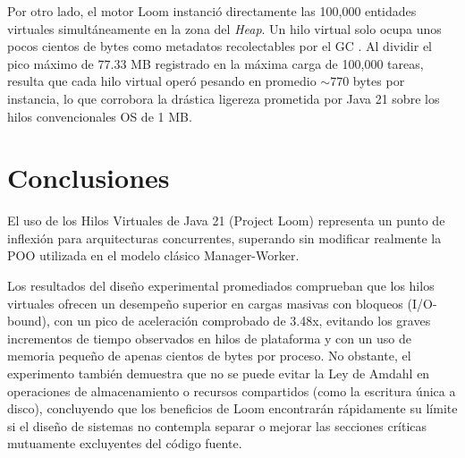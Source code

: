 \documentclass[12pt,a4paper]{article}
\begin{document}
Por otro lado, el motor Loom instanció directamente las 100,000 entidades virtuales simultáneamente en la zona del \textit{Heap}. Un hilo virtual solo ocupa unos pocos cientos de bytes como metadatos recolectables por el GC \cite{jep444}.
Al dividir el pico máximo de $77.33$ MB registrado en la máxima carga de 100,000 tareas, resulta que cada hilo virtual operó pesando en promedio $\sim770$ bytes por instancia, lo que corrobora la drástica ligereza prometida por Java 21 sobre los hilos convencionales OS de 1 MB.

\section{Conclusiones}
El uso de los Hilos Virtuales de Java 21 (Project Loom) representa un punto de inflexión para arquitecturas concurrentes, superando sin modificar realmente la POO utilizada en el modelo clásico Manager-Worker. 

Los resultados del diseño experimental promediados comprueban que los hilos virtuales ofrecen un desempeño superior en cargas masivas con bloqueos (I/O-bound), con un pico de aceleración comprobado de 3.48x, evitando los graves incrementos de tiempo observados en hilos de plataforma y con un uso de memoria pequeño de apenas cientos de bytes por proceso. No obstante, el experimento también demuestra que no se puede evitar la Ley de Amdahl en operaciones de almacenamiento o recursos compartidos (como la escritura única a disco), concluyendo que los beneficios de Loom encontrarán rápidamente su límite si el diseño de sistemas no contempla separar o mejorar las secciones críticas mutuamente excluyentes del código fuente.

 

\end{document}
